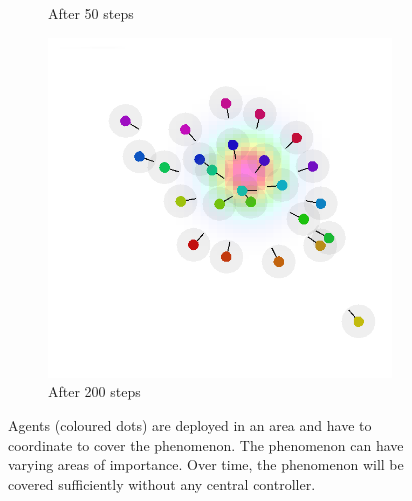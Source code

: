 \begin{figure}[t]
\begin{subfigure}[b]{0.32\linewidth}
		\caption{After 50 steps}
		\label{acsos2023:fig:after}
	\end{subfigure}
	\begin{subfigure}[b]{0.32\linewidth}
		\includegraphics[width=\textwidth]{papers/acsos2023/imgs/end.png}
		\caption{After 200 steps}
		\label{acsos2023:fig:end}
	\end{subfigure}
	\caption[Phenomenon covering overview]{Agents (coloured dots) are deployed in an area and have to coordinate to cover the phenomenon. 
   The phenomenon can have varying areas of importance. 
   Over time, the phenomenon will be covered sufficiently without any central controller.
%		
		}
	\label{acsos2023:fig:simulations}
\end{figure}


